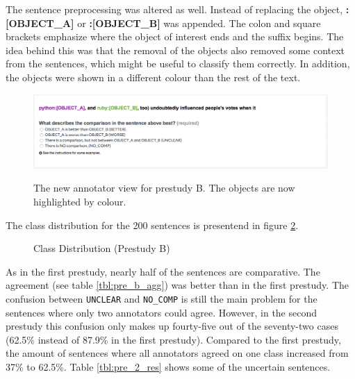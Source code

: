 The sentence preprocessing was altered as well. Instead of replacing the object, \mbox{\textbf{{\color[HTML]{9A14B2}:{[}OBJECT\_A{]}}}} or \textbf{{\color[HTML]{6CB219}:{[}OBJECT\_B{]}}} was appended. The colon and square brackets emphasize where the object of interest ends and the suffix begins. The idea behind this was that the removal of the objects also removed some context from the sentences, which might be useful to classify them correctly. In addition, the objects were shown in a different colour than the rest of the text.\newline

\begin{figure}[h]
\centering
\includegraphics[width=1\textwidth]{images/prestudy/2_question}
\label{img:2_question}
\caption{The new annotator view for prestudy B. The objects are now highlighted by colour.}
\end{figure}

The class distribution for the 200 sentences is presentend in figure \ref{fig:dist_pre_b}. 


\begin{figure}[h]
\centering
\caption{Class Distribution (Prestudy B)}
\label{fig:dist_pre_b}
\end{figure}

As in the first prestudy, nearly half of the sentences are comparative. The agreement (see table \ref{tbl:pre_b_agg}) was better than in the first prestudy. The confusion between \texttt{UNCLEAR} and \texttt{NO\_COMP} is still the main problem for the sentences where only two annotators could agree. However, in the second prestudy this confusion only makes up fourty-five out of the seventy-two cases (62.5\% instead of 87.9\% in the first prestudy). Compared to the first prestudy, the amount of sentences where all annotators agreed on one class increased from 37\% to 62.5\%. Table \ref{tbl:pre_2_res} shows some of the uncertain sentences.


